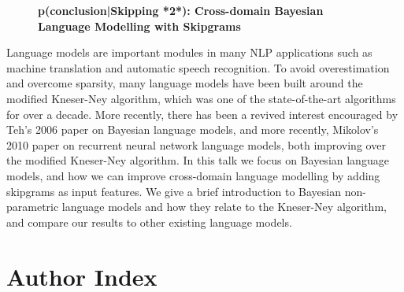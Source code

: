 \documentclass[10pt, a4paper, twopage, headinclude, footinclude, BCOR5mm]{book}
\begin{document}
\newpage

\begin{figure}[t!]
\centering
\large\textbf{p(conclusion|Skipping {*2*}): Cross-domain Bayesian \\ Language Modelling with Skipgrams}
\vspace*{0.5cm}
\end{figure}


\begin{table}[t!]
\end{table} 
\noindent
Language models are important modules in many NLP applications such as machine translation and automatic speech recognition. To avoid overestimation and overcome sparsity, many language models have been built around the modified Kneser-Ney algorithm, which was one of the state-of-the-art algorithms for over a decade. More recently, there has been a revived interest encouraged by Teh's 2006 paper on Bayesian language models, and more recently, Mikolov's 2010 paper on recurrent neural network language models, both improving over the modified Kneser-Ney algorithm. In this talk we focus on Bayesian language models, and how we can improve cross-domain language modelling by adding skipgrams as input features. We give a brief introduction to Bayesian non-parametric language models and how they relate to the Kneser-Ney algorithm, and compare our results to other existing language models.  

\newpage
\chapter{Author Index}
\printindex
\end{document}
